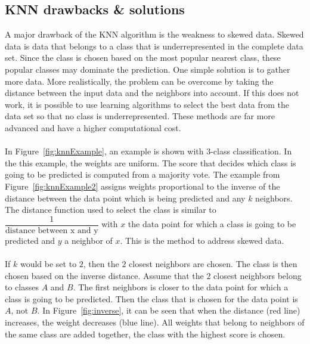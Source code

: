 \subsection{KNN drawbacks \& solutions}
\label{knn:sol}
\noindent A major drawback of the KNN algorithm is the weakness to skewed data. Skewed data is data that belongs to a class that is underrepresented in the complete data set. Since the class is chosen based on the most popular nearest class, these popular classes may dominate the prediction. One simple solution is to gather more data. More realistically, the problem can be overcome by taking the distance between the input data and the neighbors into account. If this does not work, it is possible to use learning algorithms to select the best data from the data set so that no class is underrepresented. These methods are far more advanced and have a higher computational cost. \\
\\
In Figure~\ref{fig:knnExample}, an example is shown with 3-class classification. In the this example, the weights are uniform. The score that decides which class is going to be predicted is computed from a majority vote. The example from Figure~\ref{fig:knnExample2} assigns weights proportional to the inverse of the distance between the data point which is being predicted and any $k$ neighbors. The distance function used to select the class is similar to $ \dfrac{1}{\text{distance between x and y}} $ with $x$ the data point for which a class is going to be predicted and $y$ a neighbor of $x$. This is the method to address skewed data. \\
\\
If $k$ would be set to $2$, then the $2$ closest neighbors are chosen. The class is then chosen based on the inverse distance. Assume that the $2$ closest neighbors belong to classes $A$ and $B$. The first neighbors is closer to the data point for which a class is going to be predicted. Then the class that is chosen for the data point is $A$, not $B$. In Figure~\ref{fig:inverse}, it can be seen that when the distance (red line) increases, the weight decreases (blue line). All weights that belong to neighbors of the same class are added together, the class with the highest score is chosen.

